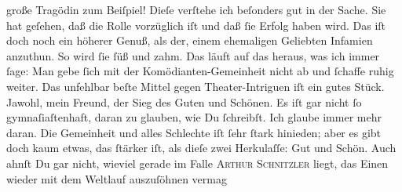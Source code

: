                große Tragödin zum Beiſpiel!
               Dieſe verſtehe ich beſonders gut in der Sache. Sie hat geſehen, daß die Rolle vorzüglich iſt und daß
               ſie Erfolg haben wird. Das iſt doch \strikeout{\textcolor{gray}{w}} noch ein höherer Genuß, als der,  einem ehemaligen Geliebten Infamien anzuthun. So
               wird ſie  ſüß und zahm. Das läuft auf das heraus,
               was ich immer ſage: Man gebe ſich mit der Komödianten-Gemeinheit {\pb}nicht ab und ſchaffe ruhig weiter. Das unfehlbar
               beſte Mittel gegen  Theater-Intriguen iſt ein
               gutes Stück. Jawohl, mein Freund, der Sieg des Guten und Schönen. Es iſt gar nicht ſo
               gymnaſiaſtenhaft, daran zu glauben, wie Du ſchreibſt. Ich glaube immer mehr daran.
               Die Gemeinheit und alles Schlechte iſt ſehr ſtark hinieden; aber es gibt doch kaum
               etwas, das ſtärker iſt, als dieſe zwei Herkulaſſe: {\pb}Gut und Schön. Auch ahnſt Du gar nicht, wieviel gerade im Falle \textsc{Arthur Schnitzler} liegt, das Einen wieder mit dem Weltlauf
               auszuſöhnen vermag{\dotssix}\pend
           
